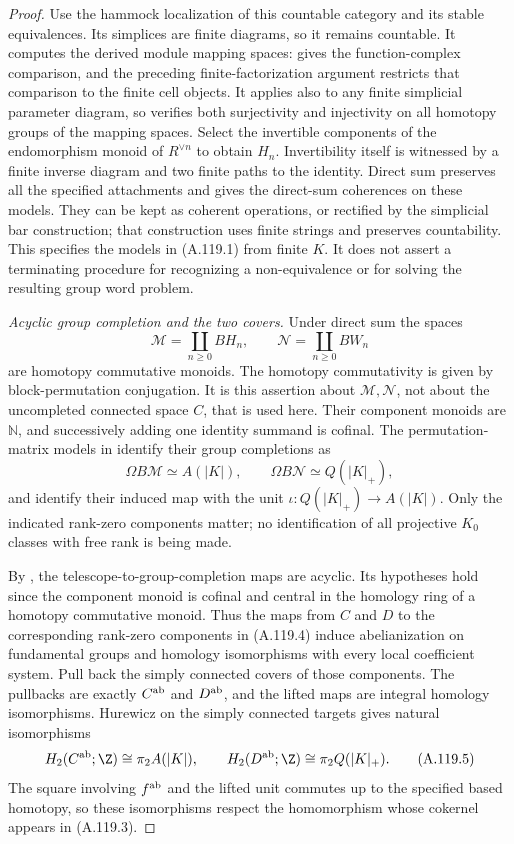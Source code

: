 \begin{proof}
Use the hammock localization of this countable category and its
stable equivalences. Its simplices are finite diagrams, so it remains
countable. It computes the derived module mapping spaces:
\cite[Proposition~4.4 and Application~4.6, p.~432]
{DwyerKan1980Functions} gives the function-complex comparison, and
the preceding finite-factorization argument restricts that comparison
to the finite cell objects. It applies also to any finite simplicial
parameter diagram, so verifies both surjectivity and injectivity on
all homotopy groups of the mapping spaces. Select the invertible
components of the endomorphism monoid of $R^{\vee n}$ to obtain
$H_n$. Invertibility itself is witnessed by a finite inverse diagram
and two finite paths to the identity. Direct sum preserves all the
specified attachments and gives the direct-sum coherences on these
models. They can be kept as coherent operations, or rectified by the
simplicial bar construction; that construction uses finite strings
and preserves countability. This specifies the models in (A.119.1)
from finite $K$. It does not assert a terminating procedure for
recognizing a non-equivalence or for solving the resulting group
word problem.

\emph{Acyclic group completion and the two covers.}
Under direct sum the spaces
\[
 \mathcal M=\coprod_{n\geq0}BH_n,
 \qquad \mathcal N=\coprod_{n\geq0}BW_n
\]
are homotopy commutative monoids. The homotopy commutativity is
given by block-permutation conjugation. It is this assertion about
$\mathcal M,\mathcal N$, not about the uncompleted connected space
$C$, that is used here. Their component monoids are $\mathbb N$, and
successively adding one identity summand is cofinal. The
permutation-matrix models in \cite[\S2, p.~247]{Jahren2010}
identify their group completions as
\[
 \Omega B\mathcal M\simeq A(|K|),
 \qquad \Omega B\mathcal N\simeq Q(|K|_+),
                                                               \tag{A.119.4}
\]
and identify their induced map with the unit
$\iota:Q(|K|_+)\to A(|K|)$. Only the indicated rank-zero
components matter; no identification of all projective $K_0$
classes with free rank is being made.

By \cite[Proposition~1.1 and proof pp.~1--7, especially p.~3]
{Gritschacher2026Acyclicity}, the telescope-to-group-completion maps
are acyclic. Its hypotheses hold since the component monoid is
cofinal and central in the homology ring of a homotopy commutative
monoid. Thus the maps from $C$ and $D$ to the corresponding
rank-zero components in (A.119.4) induce abelianization on fundamental
groups and homology isomorphisms with every local coefficient
system. Pull back the simply connected covers of those components.
The pullbacks are exactly $C^{\rm ab}$ and $D^{\rm ab}$, and the
lifted maps are integral homology isomorphisms. Hurewicz on the
simply connected targets gives natural isomorphisms
\[
 H_2(C^{\rm ab};\Z)\cong\pi_2A(|K|),
 \qquad H_2(D^{\rm ab};\Z)\cong\pi_2Q(|K|_+).
                                                               \tag{A.119.5}
\]
The square involving $f^{\rm ab}$ and the lifted unit commutes up
to the specified based homotopy, so these isomorphisms respect the
homomorphism whose cokernel appears in (A.119.3).


\end{proof}
